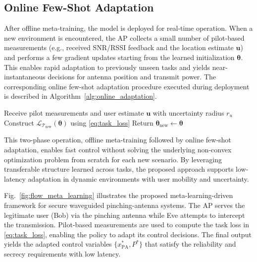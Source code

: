 \documentclass[journal,10pt]{IEEEtran}
\begin{document}
\subsection{Online Few-Shot Adaptation}
After offline meta-training, the model is deployed for real-time operation. When a new environment is encountered, the AP collects a small number of pilot-based measurements (e.g., received SNR/RSSI feedback and the location estimate $\mathbf{u}$) and performs a few gradient updates starting from the learned initialization $\boldsymbol{\theta}$. This enables rapid adaptation to previously unseen tasks and yields near-instantaneous decisions for antenna position and transmit power.
The corresponding online few-shot adaptation procedure executed during deployment is described in Algorithm~\ref{alg:online_adaptation}.
\begin{algorithm}[h]
\caption{Few-Shot Real-Time Adaptation (Online)}
\label{alg:online_adaptation}
\SetAlgoLined
{}
Receive pilot measurements and user estimate $\mathbf{u}$ with uncertainty radius $r_u$\;
Construct $\mathcal{L}_{\mathcal{T}_{\mathrm{new}}}(\boldsymbol{\theta})$ using \eqref{eq:task_loss}\;
Return $\boldsymbol{\theta}_{\mathrm{new}} \gets \boldsymbol{\theta}$\;
\end{algorithm}

This two-phase operation, offline meta-training followed by online few-shot adaptation, enables fast control without solving the underlying non-convex optimization problem from scratch for each new scenario. By leveraging transferable structure learned across tasks, the proposed approach supports low-latency adaptation in dynamic environments with user mobility and uncertainty.

Fig.~\ref{fig:flow_meta_learning} illustrates the proposed meta-learning-driven framework for secure waveguided pinching-antenna systems. The AP serves the legitimate user (Bob) via the pinching antenna while Eve attempts to intercept the transmission. Pilot-based measurements are used to compute the task loss in \eqref{eq:task_loss}, enabling the policy to adapt its control decisions. The final output yields the adapted control variables $\{x_{\mathrm{PA}}^{*}, P^{*}\}$ that satisfy the reliability and secrecy requirements with low latency.
\end{document}
